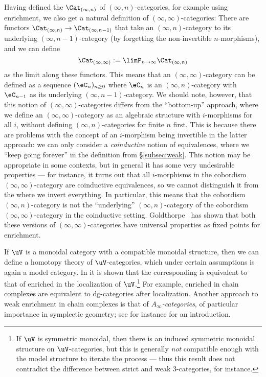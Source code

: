 \documentclass[a4paper,12pt]{article}
\begin{document}
\begin{remark}\label{rmk:coind}
  Having defined the \icats{} $\Cat_{(\infty,n)}$ of
  $(\infty,n)$-categories, for example using enrichment, we also get a
  natural definition of $(\infty,\infty)$-categories: There are
  functors $\Cat_{(\infty,n)} \to \Cat_{(\infty,n-1)}$ that take an
  $(\infty,n)$-category to its underlying $(\infty,n-1)$-category (by
  forgetting the non-invertible $n$-morphisms), and we can define
  \[ \Cat_{(\infty,\infty)} := \limP_{n \rightarrow \infty} \Cat_{(\infty,n)}\]
  as the limit along these functors. This means that an
  $(\infty,\infty)$-category can be defined as a sequence
  $(\eC_{n})_{n\geq 0}$ where $\eC_{n}$ is an $(\infty,n)$-category
  with $\eC_{n-1}$ as its underlying $(\infty,n-1)$-category. We
  should note, however, that this notion of
  $(\infty,\infty)$-categories differs from the ``bottom-up'' approach,
  where we define an $(\infty,\infty)$-category as an algebraic
  structure with $i$-morphisms for all $i$, without defining
  $(\infty,n)$-categories for finite $n$ first. This is because there
  are problems with the concept of an $i$-morphism being invertible in
  the latter approach: we can only consider a \emph{coinductive}
  notion of equivalences, where we ``keep going forever'' in the
  definition from \S\ref{subsec:weak}. This notion may be appropriate
  in some contexts, but in general it has some very undesirable
  properties --- for instance, it turns out that all $i$-morphisms in
  the cobordism $(\infty,\infty)$-category are coinductive
  equivalences, so we cannot distinguish it from the \igpd{} where we
  invert everything. In particular, this means that the cobordism
  $(\infty,n)$-category is not the ``underlying''
  $(\infty,n)$-category of the cobordism $(\infty,\infty)$-category in
  the coinductive setting.  Goldthorpe~\cite{Goldthorpe} has shown
  that both these versions of $(\infty,\infty)$-categories have
  universal properties as fixed points for \icatl{} enrichment.
\end{remark}

\begin{remark}
  If $\uV$ is a monoidal category with a compatible monoidal
  structure, then we can define a homotopy theory of $\uV$-categories,
  which under certain assumptions is again a model category. In
  \cite{enrcomp} it is shown that the corresponding \icat{} is
  equivalent to that of \icats{} enriched in the \icatl{} localization
  of $\uV$.\footnote{If $\uV$ is symmetric monoidal, then there is an
    induced symmetric monoidal structure on $\uV$-categories, but this
    is generally \emph{not} compatible enough with the model structure
    to iterate the process --- thus this result does not contradict
    the difference between strict and weak $3$-categories, for
    instance.}  For example, \icats{} enriched in chain complexes are
  equivalent to dg-categories after \icatl{} localization. Another
  approach to weak enrichment in chain complexes is that of
  \emph{$A_{\infty}$-categories}, of particular importance in
  symplectic geometry; see for instance \cite{KellerAinfty} for an
  introduction.
\end{remark}
\end{document}
